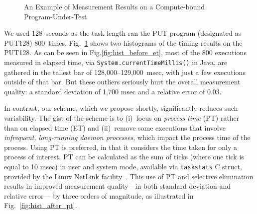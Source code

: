 \documentclass[letter]{ieice}
\begin{document}
\begin{figure}[t]
	\centering
	\caption{An Example of Measurement Results on a \linebreak \hbox{Compute-bound} 
	Program-Under-Test~\label{fig:meas_comp}}
	\vspace{-.3in}
\end{figure} 

We used 128~seconds as the task length ran the PUT program (designated as PUT128) 
800~times. Fig.~\ref{fig:meas_comp} shows two histograms of the timing results on the PUT128.
As can be seen in Fig.\ref{fig:hist_before_et}, 
most of the 800 executions measured in elapsed time, 
via  {\tt System.currentTimeMillis()} in Java, are gathered in the tallest bar 
of \hbox{128,000--129,000 msec,} with just a few executions outside of that bar. 
But these outliers seriously hurt the overall measurement quality: 
a standard deviation of 1,700 msec and a relative error of 0.03. 

In contrast, our scheme, which we propose shortly, 
significantly reduces such variability.
The gist of the scheme is to (i)~focus on
{\em process time} (PT) rather than on elapsed time (ET) and 
(ii)~remove some executions that involve
{\em infrequent, \hbox{long-running} daemon processes}, which impact
the process time of the process. 
Using PT is preferred, in that it considers 
the time taken for only a process of interest.
PT can be calculated as the sum of ticks (where one tick is equal to 10 msec)
in user and system mode, available via {\tt taskstats} C struct, 
provided by the Linux NetLink facility~\cite{Netlink}.
This use of PT and selective elimination 
results in improved 
measurement quality---in both standard deviation and relative error---
by three orders of magnitude, 
as illustrated in Fig.~\ref{fig:hist_after_pt}. 
\end{document}
